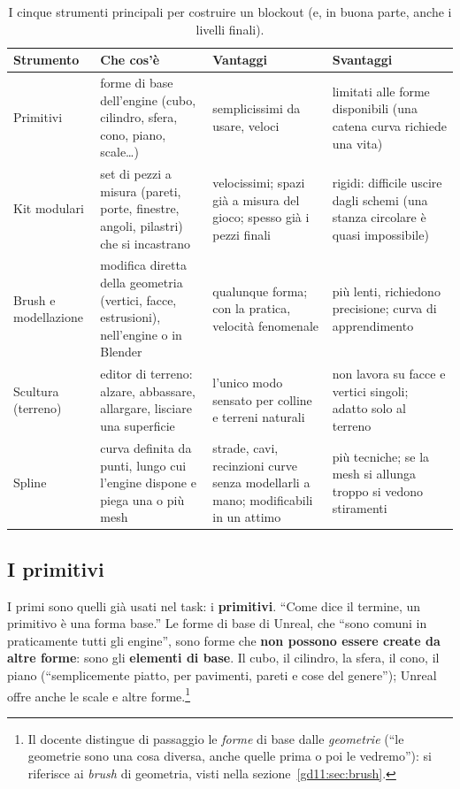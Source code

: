 \begin{table}[htbp]
\centering
\small
\begin{tabular}{@{}p{2.4cm}p{3.6cm}p{3.6cm}p{3.6cm}@{}}
\toprule
\textbf{Strumento} & \textbf{Che cos'è} & \textbf{Vantaggi} & \textbf{Svantaggi} \\
\midrule
Primitivi & forme di base dell'engine (cubo, cilindro, sfera, cono, piano, scale\ldots) &
  semplicissimi da usare, veloci & limitati alle forme disponibili (una catena curva richiede una vita) \\
\addlinespace
Kit modulari & set di pezzi a misura (pareti, porte, finestre, angoli, pilastri) che si incastrano &
  velocissimi; spazi già a misura del gioco; spesso già i pezzi finali &
  rigidi: difficile uscire dagli schemi (una stanza circolare è quasi impossibile) \\
\addlinespace
Brush e modellazione & modifica diretta della geometria (vertici, facce, estrusioni), nell'engine o in Blender &
  qualunque forma; con la pratica, velocità fenomenale &
  più lenti, richiedono precisione; curva di apprendimento \\
\addlinespace
Scultura (terreno) & editor di terreno: alzare, abbassare, allargare, lisciare una superficie &
  l'unico modo sensato per colline e terreni naturali &
  non lavora su facce e vertici singoli; adatto solo al terreno \\
\addlinespace
Spline & curva definita da punti, lungo cui l'engine dispone e piega una o più mesh &
  strade, cavi, recinzioni curve senza modellarli a mano; modificabili in un attimo &
  più tecniche; se la mesh si allunga troppo si vedono stiramenti \\
\bottomrule
\end{tabular}
\caption{I cinque strumenti principali per costruire un blockout (e, in buona
parte, anche i livelli finali).}
\label{gd11:tab:strumenti}
\end{table}

\subsection{I primitivi}
\label{gd11:sec:primitivi}

I primi sono quelli già usati nel task: i \textbf{primitivi}. ``Come dice il
termine, un primitivo è una forma base.'' Le forme di base di Unreal, che ``sono
comuni in praticamente tutti gli engine'', sono forme che \textbf{non possono
essere create da altre forme}: sono gli \textbf{elementi di base}. Il cubo, il
cilindro, la sfera, il cono, il piano (``semplicemente piatto, per pavimenti,
pareti e cose del genere''); Unreal offre anche le scale e altre
forme.\footnote{Il docente distingue di passaggio le \emph{forme} di base dalle
\emph{geometrie} (``le geometrie sono una cosa diversa, anche quelle prima o
poi le vedremo''): si riferisce ai \emph{brush} di geometria, visti nella
sezione~\ref{gd11:sec:brush}.}

